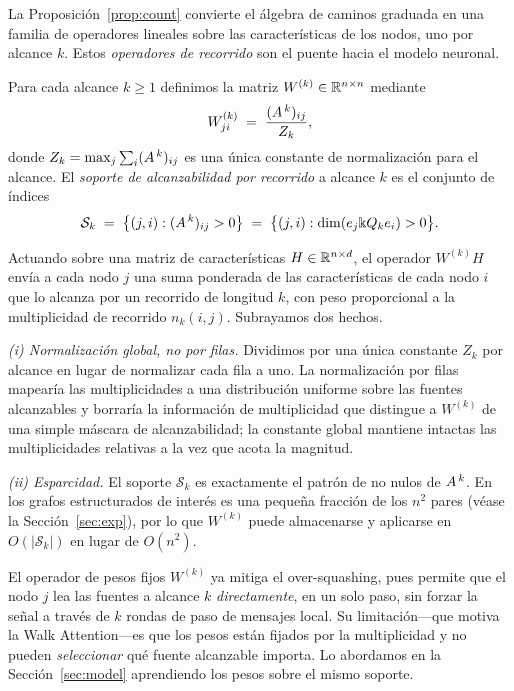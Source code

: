 La Proposición~\ref{prop:count} convierte el álgebra de caminos graduada en una familia de
operadores lineales sobre las características de los nodos, uno por alcance $k$. Estos \emph{operadores de recorrido}
son el puente hacia el modelo neuronal.

\begin{definition}\label{def:walkop}
Para cada alcance $k\ge 1$ definimos la matriz $W^{(k)}\in\mathbb{R}^{n\times n}$ mediante
\[
  W^{(k)}_{j i}\;=\;\frac{(A^{\,k})_{ij}}{\,Z_k\,},
\]
donde $Z_k=\max_{j}\sum_i (A^{\,k})_{ij}$ es una única constante de normalización para
el alcance. El \emph{soporte de alcanzabilidad por recorrido} a alcance $k$ es el conjunto de índices
\[
  \mathcal{S}_k \;=\; \bigl\{(j,i): (A^{\,k})_{ij}>0\bigr\}
  \;=\;\bigl\{(j,i): \dim(e_j\Bbbk Q_k e_i)>0\bigr\}.
\]
\end{definition}

Actuando sobre una matriz de características $H\in\mathbb{R}^{n\times d}$, el operador $W^{(k)}H$ envía a
cada nodo $j$ una suma ponderada de las características de cada nodo $i$ que lo alcanza por
un recorrido de longitud $k$, con peso proporcional a la multiplicidad de recorrido
$n_k(i,j)$. Subrayamos dos hechos.

\emph{(i) Normalización global, no por filas.} Dividimos por una única
constante $Z_k$ por alcance en lugar de normalizar cada fila a uno. La normalización
por filas mapearía las multiplicidades a una distribución uniforme sobre las
fuentes alcanzables y borraría la información de multiplicidad que
distingue a $W^{(k)}$ de una simple máscara de alcanzabilidad; la constante global mantiene
intactas las multiplicidades relativas a la vez que acota la magnitud.

\emph{(ii) Esparcidad.} El soporte $\mathcal{S}_k$ es exactamente el patrón de no nulos
de $A^{\,k}$. En los grafos estructurados de interés es una pequeña fracción de
los $n^2$ pares (véase la Sección~\ref{sec:exp}), por lo que $W^{(k)}$ puede almacenarse y
aplicarse en $O(|\mathcal{S}_k|)$ en lugar de $O(n^2)$.

El operador de pesos fijos $W^{(k)}$ ya mitiga el over-squashing, pues
permite que el nodo $j$ lea las fuentes a alcance $k$ \emph{directamente}, en un solo paso, sin
forzar la señal a través de $k$ rondas de paso de mensajes local. Su
limitación---que motiva la Walk Attention---es que los pesos están fijados por
la multiplicidad y no pueden \emph{seleccionar} qué fuente alcanzable importa. Lo abordamos
en la Sección~\ref{sec:model} aprendiendo los pesos sobre el mismo soporte.

